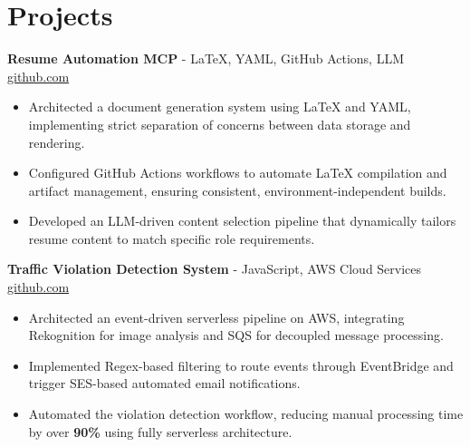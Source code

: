 \documentclass[11pt]{article}
\begin{document}
\vspace{-18.5pt}

\section*{Projects}

\textbf{Resume Automation MCP}{ - LaTeX, YAML, GitHub Actions, LLM} \hfill \href{https://github.com/Monica20030707/Tex_OrangeLeaf-mcp}{github.com}
\vspace{-9pt}
\begin{itemize}
  \item Architected a document generation system using LaTeX and YAML, implementing strict separation of concerns between data storage and rendering.
  \item Configured GitHub Actions workflows to automate LaTeX compilation and artifact management, ensuring consistent, environment-independent builds.
  \item Developed an LLM-driven content selection pipeline that dynamically tailors resume content to match specific role requirements.
\end{itemize}

\textbf{Traffic Violation Detection System}{ - JavaScript, AWS Cloud Services} \hfill \href{https://github.com/Monica20030707/AWS_rekonigition-N-read-database}{github.com}
\vspace{-9pt}
\begin{itemize}
  \item Architected an event-driven serverless pipeline on AWS, integrating Rekognition for image analysis and SQS for decoupled message processing.
  \item Implemented Regex-based filtering to route events through EventBridge and trigger SES-based automated email notifications.
  \item Automated the violation detection workflow, reducing manual processing time by over \textbf{90\%} using fully serverless architecture.
\end{itemize}

\end{document}
